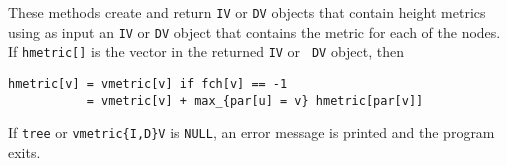 \begin{enumerate}
These methods create and return {\tt IV} or {\tt DV} objects 
that contain height metrics using as input an {\tt IV} or {\tt DV}
object that contains the metric for each of the nodes.
If {\tt hmetric[]} is the vector in the returned {\tt IV} or {\tt
DV} object, then
\begin{verbatim}
hmetric[v] = vmetric[v] if fch[v] == -1
           = vmetric[v] + max_{par[u] = v} hmetric[par[v]] 
\end{verbatim}
\par {}
If {\tt tree} or {\tt vmetric\{I,D\}V} is {\tt NULL},
an error message is printed and the program exits.
\end{enumerate}
\par

